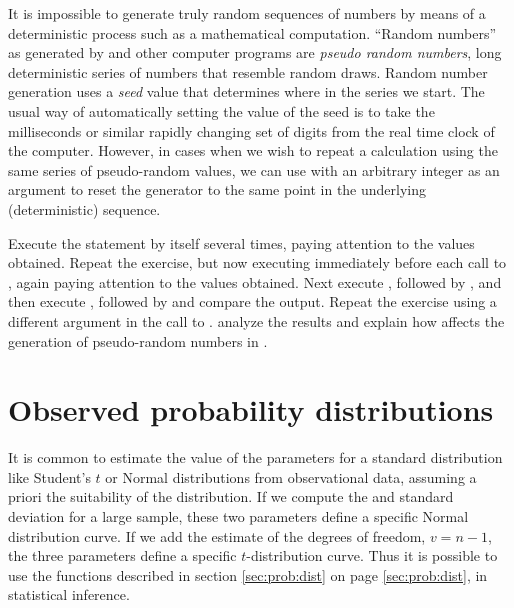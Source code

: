 \documentclass[krantz2]{krantz}\usepackage{knitr}
\begin{document}
\begin{explainbox}
It is impossible to generate truly random sequences of numbers by means of a deterministic process such as a mathematical computation. ``Random numbers'' as generated by \Rpgrm and other computer programs are \emph{pseudo random numbers}, long deterministic series of numbers that resemble random draws. Random number generation uses a \emph{seed} value that determines where in the series we start. The usual way of automatically setting the value of the seed is to take the milliseconds or similar rapidly changing set of digits from the real time clock of the computer. However, in cases when we wish to repeat a calculation using the same series of pseudo-random values, we can use  with an arbitrary integer as an argument to reset the generator to the same point in the underlying (deterministic) sequence.
\end{explainbox}

\begin{advplayground}
Execute the statement  by itself several times, paying attention to the values obtained. Repeat the exercise, but now executing  immediately before each call to , again paying attention to the values obtained. Next execute , followed by , and then execute , followed by  and compare the output. Repeat the exercise using a different argument in the call to . analyze the results and explain how  affects the generation of pseudo-random numbers in \Rlang.
\end{advplayground}

\section{Observed probability distributions}

It is common to estimate the value of the parameters for a standard distribution like Student's $t$ or Normal distributions from observational data, assuming a priori the suitability of the distribution. If we compute the and standard deviation for a large sample, these two parameters define a specific Normal distribution curve. If we add the estimate of the degrees of freedom, $v = n - 1$, the three parameters define a specific $t$-distribution curve. Thus it is possible to use the functions described in section \ref{sec:prob:dist} on page \ref{sec:prob:dist}, in statistical inference.
\end{document}

